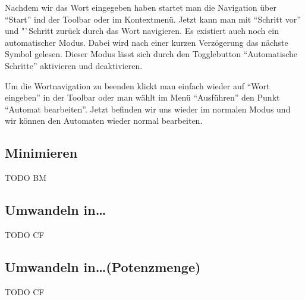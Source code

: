   Nachdem wir das Wort eingegeben haben startet man die Navigation über
  "`Start"' ind der Toolbar oder im Kontextmenü. Jetzt kann man mit "`Schritt
  vor"' und "`Schritt zurück durch das Wort navigieren. Es existiert auch noch
  ein automatischer Modus. Dabei wird nach einer kurzen Verzögerung das nächste
  Symbol gelesen. Dieser Modus lässt sich durch den Togglebutton "`Automatische
  Schritte"' aktivieren und deaktivieren.\vspace{10pt}
  
  Um die Wortnavigation zu beenden klickt man einfach wieder auf "`Wort
  eingeben"' in der Toolbar oder man wählt im Menü "`Ausführen"' den Punkt
  "`Automat bearbeiten"'. Jetzt befinden wir uns wieder im normalen Modus und
  wir können den Automaten wieder normal bearbeiten.
   
\subsection{Minimieren}
  
  TODO BM
  
\subsection{Umwandeln in\ldots}
  
  TODO CF
  
\subsection{Umwandeln in\ldots (Potenzmenge)}
  
  TODO CF
  
  
